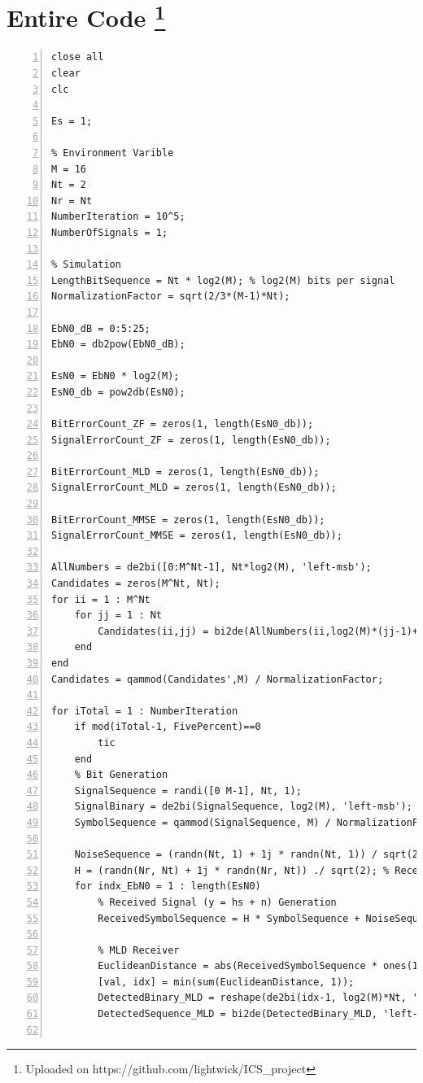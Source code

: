 \documentclass{article}
\begin{document}
\section[Entire Code]{Entire Code \footnote{Uploaded on https://github.com/lightwick/ICS\_project}}
\begin{lstlisting}[style=Matlab-editor, frame=single, numbers=left,]
close all
clear
clc

Es = 1;

% Environment Varible
M = 16
Nt = 2
Nr = Nt
NumberIteration = 10^5;
NumberOfSignals = 1;

% Simulation
LengthBitSequence = Nt * log2(M); % log2(M) bits per signal
NormalizationFactor = sqrt(2/3*(M-1)*Nt);

EbN0_dB = 0:5:25;
EbN0 = db2pow(EbN0_dB);

EsN0 = EbN0 * log2(M);
EsN0_db = pow2db(EsN0);

BitErrorCount_ZF = zeros(1, length(EsN0_db));
SignalErrorCount_ZF = zeros(1, length(EsN0_db));

BitErrorCount_MLD = zeros(1, length(EsN0_db));
SignalErrorCount_MLD = zeros(1, length(EsN0_db));

BitErrorCount_MMSE = zeros(1, length(EsN0_db));
SignalErrorCount_MMSE = zeros(1, length(EsN0_db));

AllNumbers = de2bi([0:M^Nt-1], Nt*log2(M), 'left-msb');
Candidates = zeros(M^Nt, Nt);
for ii = 1 : M^Nt
    for jj = 1 : Nt
        Candidates(ii,jj) = bi2de(AllNumbers(ii,log2(M)*(jj-1)+1:log2(M)*jj), 'left-msb');
    end
end
Candidates = qammod(Candidates',M) / NormalizationFactor;

for iTotal = 1 : NumberIteration
    if mod(iTotal-1, FivePercent)==0
        tic
    end
    % Bit Generation
    SignalSequence = randi([0 M-1], Nt, 1);
    SignalBinary = de2bi(SignalSequence, log2(M), 'left-msb');
    SymbolSequence = qammod(SignalSequence, M) / NormalizationFactor;
    
    NoiseSequence = (randn(Nt, 1) + 1j * randn(Nt, 1)) / sqrt(2); % Noise (n) Generation
    H = (randn(Nr, Nt) + 1j * randn(Nr, Nt)) ./ sqrt(2); % Receiver x Transmitter
    for indx_EbN0 = 1 : length(EsN0)
        % Received Signal (y = hs + n) Generation
        ReceivedSymbolSequence = H * SymbolSequence + NoiseSequence * sqrt(1 / EsN0(indx_EbN0)); % log2(M)x1 matrix
        
        % MLD Receiver
        EuclideanDistance = abs(ReceivedSymbolSequence * ones(1,M^Nt) - H*Candidates).^2; % results in Nt x M^Nt, each column representing each candidate symbol combination
        [val, idx] = min(sum(EuclideanDistance, 1));
        DetectedBinary_MLD = reshape(de2bi(idx-1, log2(M)*Nt, 'left-msb'),log2(M),[])'; % MOST LIKELY WRONG
        DetectedSequence_MLD = bi2de(DetectedBinary_MLD, 'left-msb');
        

\end{lstlisting}
\end{document}
